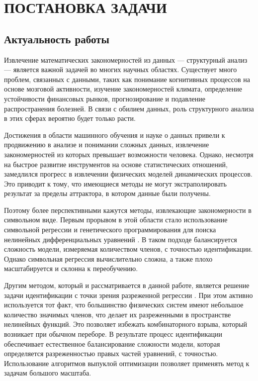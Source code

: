 \section{ПОСТАНОВКА ЗАДАЧИ}

\subsection{Актуальность работы}

Извлечение математических закономерностей из данных --- структурный анализ --- является важной задачей во многих научных областях. Существует много проблем, связанных с данными, таких как понимание когнитивных процессов на основе мозговой активности, изучение закономерностей климата, определение устойчивости финансовых рынков, прогнозирование и подавление распространения болезней. В связи с обилием данных, роль структурного анализа в этих сферах вероятно будет только расти.

Достижения в области машинного обучения и науке о данных привели к продвижению в анализе и понимании сложных данных, извлечение закономерностей из которых превышает возможности человека. Однако, несмотря на быстрое развитие инструментов на основе статистических отношений, замедлился прогресс в извлечении физических моделей динамических процессов. Это приводит к тому, что имеющиеся методы не могут экстраполировать результат за пределы аттрактора, в котором данные были получены.

Поэтому более перспективными кажутся методы, извлекающие закономерности в символьном виде. Первым прорывом в этой области стало использование символьной регрессии и генетического программирования для поиска нелинейных дифференциальных уравнений \cite{symbolic, genetic}. В таком подходе балансируется сложность модели, измеряемая количеством членов, с точностью идентификации. Однако символьная регрессия вычислительно сложна, а также плохо масштабируется и склонна к переобучению.

Другим методом, который и рассматривается в данной работе, является решение задачи идентификации с точки зрения разреженной регрессии \cite{sindy, lasso}. При этом активно используется тот факт, что большинство физических систем имеют небольшое количество значимых членов, что делает их разреженными в пространстве нелинейных функций. Это позволяет избежать комбинаторного взрыва, который возникает при обычном переборе. В результате процесс идентификации обеспечивает естественное балансирование сложности модели, которая определяется разреженностью правых частей уравнений, с точностью. Использование алгоритмов выпуклой оптимизации позволяет применять метод к задачам большого масштаба.

